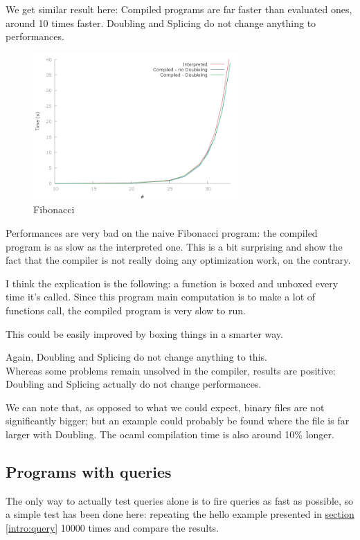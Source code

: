 \documentclass[11pt]{article}
\newcommand\refsec[1]{\hyperref[#1]{section \ref*{#1}}}
\begin{document}
We get similar result here: Compiled programs are far faster than evaluated ones, around 10 times faster. Doubling and Splicing do not change anything to performances.

\begin{figure}[!htbp]
  \centering
  \includegraphics[width=0.7\textwidth]{fib.png}
  \caption{Fibonacci}
\end{figure}

Performances are very bad on the naive Fibonacci program: the compiled program is as slow as the interpreted one. This is a bit surprising and show the fact that the compiler is not really doing any optimization work, on the contrary. 

I think the explication is the following: a function is boxed and unboxed every time it's called. Since this program main computation is to make a lot of functions call, the compiled program is very slow to run.

This could be easily improved by boxing things in a smarter way.

Again, Doubling and Splicing do not change anything to this.\\

Whereas some problems remain unsolved in the compiler, results are positive: Doubling and Splicing actually do not change performances. 

We can note that, as opposed to what we could expect, binary files are not significantly bigger; but an example could probably be found where the file is far larger with Doubling. The ocaml compilation time is also around 10\% longer.

\subsection{Programs with queries}

The only way to actually test queries alone is to fire queries as fast as possible, so a simple test has been done here: repeating the hello example presented in \refsec{intro:query} 10000 times and compare the results. 
\end{document}
